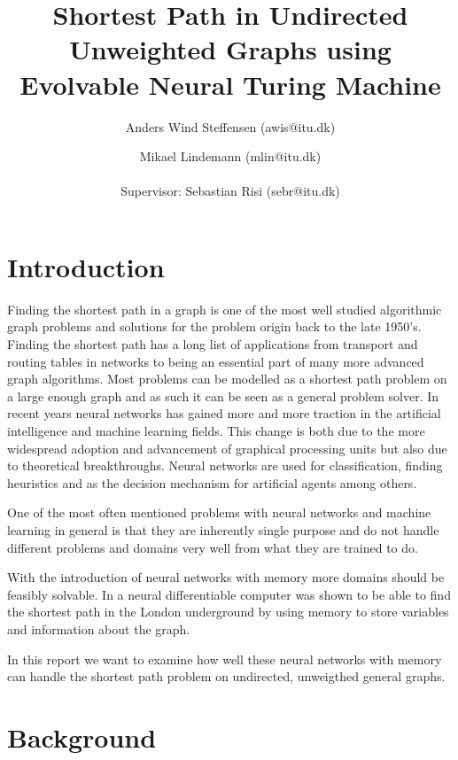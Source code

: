 \documentclass{article}
\author{Anders Wind Steffensen (awis@itu.dk)\and Mikael Lindemann (mlin@itu.dk)\\\\Supervisor: Sebastian Risi (sebr@itu.dk)}
\title{Shortest Path in Undirected Unweighted Graphs using Evolvable Neural Turing Machine}
\newcommand{\newpar}{\bigskip\noindent}
\begin{document}
\maketitle
\tableofcontents
\listoftodos
\newpage
\section{Introduction}
Finding the shortest path in a graph is one of the most well studied algorithmic graph problems and solutions for the problem origin back to the late 1950's. Finding the shortest path has a long list of applications from transport and routing tables in networks to being an essential part of many more advanced graph algorithms. Most problems can be modelled as a shortest path problem on a large enough graph and as such it can be seen as a general problem solver. In recent years neural networks has gained more and more traction in the artificial intelligence and machine learning fields. This change is both due to the more widespread adoption and advancement of graphical processing units but also due to theoretical breakthroughs. Neural networks are used for classification, finding heuristics and as the decision mechanism for artificial agents among others.

\newpar One of the most often mentioned problems with neural networks and machine learning in general is that they are inherently single purpose and do not handle different problems and domains very well from what they are trained to do.

\newpar With the introduction of neural networks with memory more domains should be feasibly solvable. In  a neural differentiable computer was shown to be able to find the shortest path in the London underground by using memory to store variables and information about the graph.

\newpar In this report we want to examine how well these neural networks with memory can handle the shortest path problem on undirected, unweigthed general graphs.

\section{Background}
\end{document}

